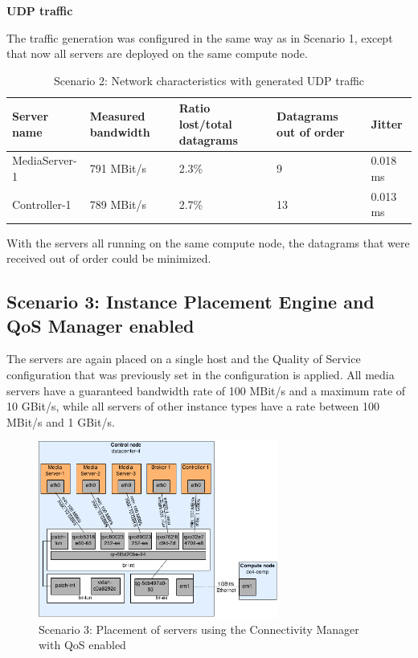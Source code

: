 \textbf{UDP traffic}

The traffic generation was configured in the same way as in Scenario 1, except that now all servers are deployed on the same compute node.

\begin{table}[H]
\centering

\begin{tabularx}{\textwidth}{ |X|X|X|X|X| }
\hline Server name & Measured bandwidth & Ratio lost/total datagrams & Datagrams out of order & Jitter \\ 
\hline MediaServer-1 & 791 MBit/s & 2.3\% & 9 & 0.018 ms\\ 
\hline Controller-1 & 789 MBit/s & 2.7\% & 13 & 0.013 ms \\ 
\hline 
\end{tabularx}

\caption{Scenario 2: Network characteristics with generated UDP traffic}
\end{table}

With the servers all running on the same compute node, the datagrams that were received out of order could be minimized.
\newpage
\subsection{Scenario 3: Instance Placement Engine and QoS Manager enabled}

The servers are again placed on a single host and the Quality of Service configuration that was previously set in the configuration is applied. All media servers have a guaranteed bandwidth rate of 100 MBit/s and a maximum rate of 10 GBit/s, while all servers of other instance types have a rate between 100 MBit/s and 1 GBit/s.

\begin{figure}[H]
\centering

\includegraphics[width=0.7\textwidth]{images/evaluation/testbed_scenario3}

\caption{Scenario 3: Placement of servers using the Connectivity Manager with QoS enabled}
\end{figure}

